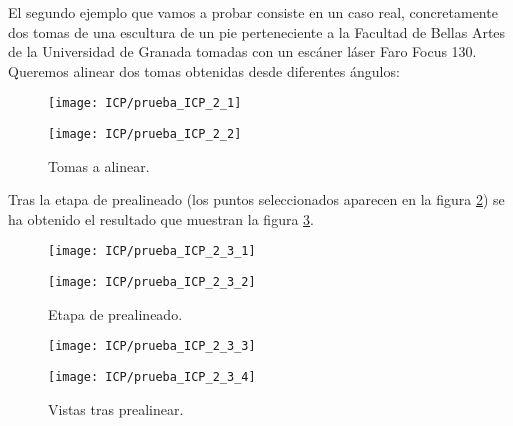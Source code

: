 
El segundo ejemplo que vamos a probar consiste en un caso real, concretamente dos tomas de una escultura de un pie perteneciente a la Facultad de Bellas Artes de la Universidad de Granada tomadas con un escáner láser Faro Focus 130. Queremos alinear dos tomas obtenidas desde diferentes ángulos: \\

\begin{figure}[h!]
	
	\begin{minipage}[b]{0.5\textwidth}
		\centering
		\texttt{[image: ICP/prueba\_ICP\_2\_1]} 
		\caption*{Conjunto (1) con $ 7\,042 $ puntos.}
	\end{minipage}
	\begin{minipage}[b]{0.5\textwidth}
		\centering
		\texttt{[image: ICP/prueba\_ICP\_2\_2]}
		\caption*{Conjunto (2) con $ 8\,334 $ puntos.}
	\end{minipage}
	
	\caption{Tomas a alinear.}
	\label{fig:ICP_2}
\end{figure}

Tras la etapa de prealineado (los puntos seleccionados aparecen en la figura \ref{pre1}) se ha obtenido el resultado que muestran la figura \ref{pre2}. \\
\begin{figure}[h!]
	\begin{minipage}[b]{0.5\textwidth}
		\centering
		\texttt{[image: ICP/prueba\_ICP\_2\_3\_1]} 
		\caption*{Puntos clave del primer conjunto.}
	\end{minipage}
	\begin{minipage}[b]{0.5\textwidth}
		\centering
		\texttt{[image: ICP/prueba\_ICP\_2\_3\_2]}
		\caption*{Puntos clave del segundo conjunto.}
	\end{minipage}
	\caption{Etapa de prealineado.}
	\label{pre1}
\end{figure}
\begin{figure}[h!]
	
	\begin{minipage}[b]{0.5\textwidth}
		\centering
		\texttt{[image: ICP/prueba\_ICP\_2\_3\_3]} 
		\caption*{Vista 1}
	\end{minipage}
	\begin{minipage}[b]{0.5\textwidth}
		\centering
		\texttt{[image: ICP/prueba\_ICP\_2\_3\_4]}
		\caption*{Vista 2}
	\end{minipage}
	\caption{Vistas tras prealinear.}
		\label{pre2}
\end{figure}

